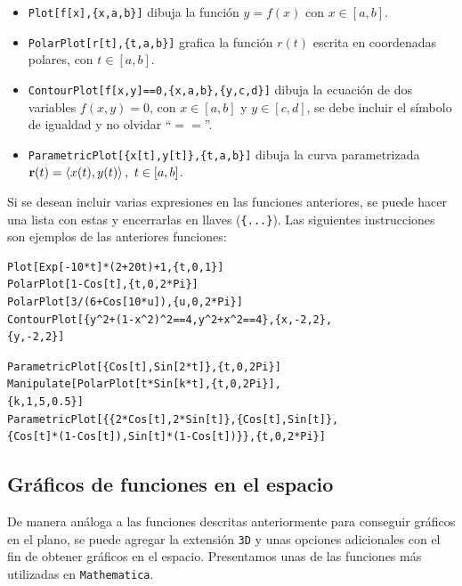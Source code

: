         \begin{itemize}
          \item \verb"Plot[f[x],{x,a,b}]" dibuja la función $y=f(x)$ con $x \in[a,b]$. 
          \item \verb"PolarPlot[r[t],{t,a,b}]" grafica la función $r(t)$ escrita en coordenadas polares, con $t \in[a,b]$.
          \item \verb"ContourPlot[f[x,y]==0,{x,a,b},{y,c,d}]" dibuja la ecuación de dos variables $f(x,y)=0$, con $x \in[a,b]$ y $y \in[c,d]$, se debe incluir el símbolo de igualdad y no olvidar “$==$”.
          \item \verb"ParametricPlot[{x[t],y[t]},{t,a,b}]" dibuja la curva parametrizada $\mathbf{r}(t)=\left\langle x(t),y(t)\right\rangle ,\,\, t\in \lbrack a,b]$.
      \end{itemize}
      Si se desean incluir varias expresiones en las funciones anteriores,
      se puede hacer una lista con estas y encerrarlas en llaves (\verb"{...}").
      Las siguientes instrucciones son ejemplos de las anteriores funciones:

      \begin{tcolorbox}[title=Algunos gráficos en el plano]
\begin{Verbatim}
Plot[Exp[-10*t]*(2+20t)+1,{t,0,1}]
PolarPlot[1-Cos[t],{t,0,2*Pi}]
PolarPlot[3/(6+Cos[10*u]),{u,0,2*Pi}]
ContourPlot[{y^2+(1-x^2)^2==4,y^2+x^2==4},{x,-2,2},
{y,-2,2}]
\end{Verbatim}
\begin{Verbatim}
ParametricPlot[{Cos[t],Sin[2*t]},{t,0,2Pi}]
Manipulate[PolarPlot[t*Sin[k*t],{t,0,2Pi}],
{k,1,5,0.5}]
ParametricPlot[{{2*Cos[t],2*Sin[t]},{Cos[t],Sin[t]},
{Cos[t]*(1-Cos[t]),Sin[t]*(1-Cos[t])}},{t,0,2*Pi}]
\end{Verbatim}
      \end{tcolorbox}

      \subsection{Gráficos de funciones en el espacio}
      De manera análoga a las funciones descritas anteriormente para
      conseguir gráficos en el plano, se puede agregar la extensión \verb"3D" y unas opciones adicionales
      con el fin de obtener gráficos en el espacio.
      Presentamos unas de las funciones más utilizadas en  \verb"Mathematica".

